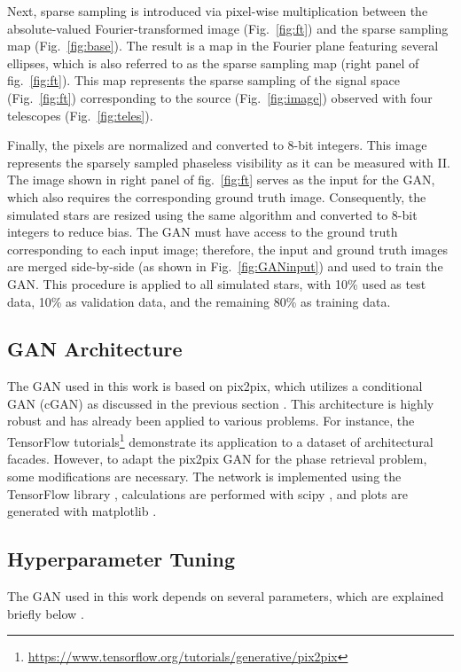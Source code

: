 Next, sparse sampling is introduced via pixel-wise multiplication between the absolute-valued Fourier-transformed image (Fig.~\ref{fig:ft}) and the sparse sampling map (Fig.~\ref{fig:base}). The result is a map in the Fourier plane featuring several ellipses, which is also referred to as the sparse sampling map (right panel of fig.~\ref{fig:ft}). This map represents the sparse sampling of the signal space (Fig.~\ref{fig:ft}) corresponding to the source (Fig.~\ref{fig:image}) observed with four telescopes (Fig.~\ref{fig:teles}). 

Finally, the pixels are normalized and converted to 8-bit integers. This image represents the sparsely sampled phaseless visibility as it can be measured with II. The image shown in right panel of fig.~\ref{fig:ft} serves as the input for the GAN, which also requires the corresponding ground truth image. Consequently, the simulated stars are resized using the same algorithm and converted to 8-bit integers to reduce bias. The GAN must have access to the ground truth corresponding to each input image; therefore, the input and ground truth images are merged side-by-side (as shown in Fig.~\ref{fig:GANinput}) and used to train the GAN. This procedure is applied to all simulated stars, with 10\% used as test data, 10\% as validation data, and the remaining 80\% as training data.


\subsection{GAN Architecture}
The GAN used in this work is based on pix2pix, which utilizes a conditional GAN (cGAN) as discussed in the previous section \citep{isola2017image}. This architecture is highly robust and has already been applied to various problems. For instance, the TensorFlow tutorials\footnote{\url{https://www.tensorflow.org/tutorials/generative/pix2pix}} demonstrate its application to a dataset of architectural facades. However, to adapt the pix2pix GAN for the phase retrieval problem, some modifications are necessary. The network is implemented using the TensorFlow library \citep{abadi2016tensorflow}, calculations are performed with scipy \citep{virtanen2020scipy}, and plots are generated with matplotlib \citep{4160265}.

\subsection{Hyperparameter Tuning}
The GAN used in this work depends on several parameters, which are explained briefly below \citep[for a more in-depth discussion, see][]{murphy2022probabilistic}.

